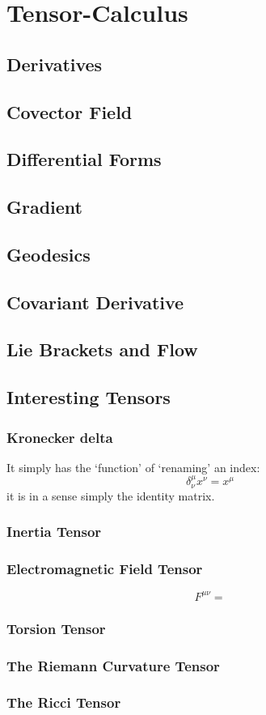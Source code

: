 \chapter{Tensor-Calculus}
\section{Derivatives}

\section{Covector Field}
\section{Differential Forms}
\section{Gradient}
\section{Geodesics}
\section{Covariant Derivative}
\section{Lie Brackets and Flow}
\section{Interesting Tensors}
\subsection{Kronecker delta}
It simply has the ‘function’ of ‘renaming’ an index:
$$\delta^{\mu}_{\nu} x^{\nu} = x^{\mu}$$
it is in a sense simply the identity matrix.
\subsection{Inertia Tensor}
\subsection{Electromagnetic Field Tensor}
\begin{equation}
F^{\mu \nu} = 
\end{equation}
\subsection{Torsion Tensor}
\subsection{The Riemann Curvature Tensor}
\subsection{The Ricci Tensor}